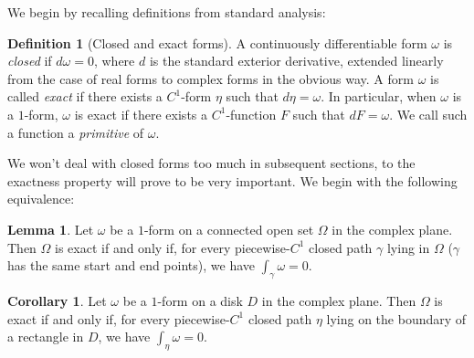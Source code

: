 \documentclass[aps,pra,showpacs,notitlepage,onecolumn,superscriptaddress,nofootinbib]{revtex4-1}
\theoremstyle{definition}
\newtheorem{definition}{Definition}[section]
\newtheorem{lemma}{Lemma}[section]
\newtheorem{corollary}{Corollary}[theorem]
\begin{document}
\noindent We begin by recalling definitions from standard analysis:
\begin{definition}[Closed and exact forms]
  A continuously differentiable form $\omega$ is \emph{closed} if $d\omega = 0$, where $d$ is the standard exterior derivative, extended linearly from the case of real forms to complex forms in the obvious way.
  A form $\omega$ is called \emph{exact} if there exists a $C^1$-form $\eta$ such that $d\eta = \omega$. In particular, when $\omega$ is a $1$-form, $\omega$ is exact if there exists a $C^1$-function $F$ such that $dF = \omega$.
  We call such a function a \emph{primitive} of $\omega$.
\end{definition}

\noindent We won't deal with closed forms too much in subsequent sections, to the exactness property will prove to be very important. We begin with the following equivalence:
\begin{lemma}
  Let $\omega$ be a $1$-form on a connected open set $\Omega$ in the complex plane. Then $\Omega$ is exact if and only if, for every piecewise-$C^1$ closed path $\gamma$ lying in $\Omega$ ($\gamma$
  has the same start and end points), we have $\int_{\gamma} \omega = 0$.
\end{lemma}

\begin{corollary}
  Let $\omega$ be a $1$-form on a disk $D$ in the complex plane. Then $\Omega$ is exact if and only if, for every piecewise-$C^1$ closed path $\eta$ lying on the boundary of a rectangle in $D$, we have $\int_{\eta} \omega = 0$.
\end{corollary}

\begin{comment}
\begin{lemma}[Green-Riemann formula]
  Let $\omega = p dx + q dy$ be a $C^1$-form on connected open set $\Omega$. Then, if $R$ is a rectangle lying in $\Omega$, and $\gamma$ is the curve describing its boundary:
  \begin{equation}
    \displaystyle\int_{\gamma} p(x, y) dx + q(x, y) dy = \displaystyle\int_{R} \left( \frac{\partial p}{\partial y} - \frac{\partial q}{\partial x} \right) dx \wedge dy
    \end{equation}
\end{lemma}
\begin{proof}
  This is an immediate consequence of Stokes' theorem.
  \newline

  \noindent Of course, we can also prove this fact without Stokes' theorem.
\end{proof}
\end{comment}
\end{document}
